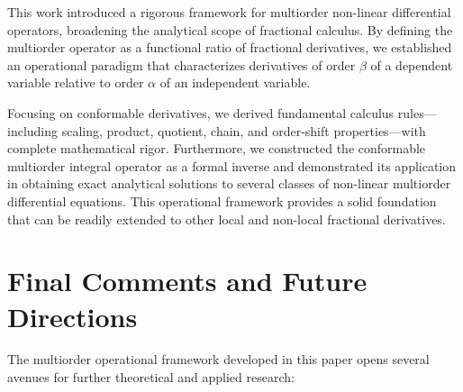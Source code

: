 \documentclass[oneside,10pt]{article}
\theoremstyle{plain}
\theoremstyle{definition}
\begin{document}
This work introduced a rigorous framework for multiorder non-linear differential operators, broadening the analytical scope of fractional calculus. By defining the multiorder operator as a functional ratio of fractional derivatives, we established an operational paradigm that characterizes derivatives of order $\beta$ of a dependent variable relative to order $\alpha$ of an independent variable. 

Focusing on conformable derivatives, we derived fundamental calculus rules—including scaling, product, quotient, chain, and order-shift properties—with complete mathematical rigor. Furthermore, we constructed the conformable multiorder integral operator as a formal inverse and demonstrated its application in obtaining exact analytical solutions to several classes of non-linear multiorder differential equations. This operational framework provides a solid foundation that can be readily extended to other local and non-local fractional derivatives.

\section{Final Comments and Future Directions}\label{sec:final_comments}

The multiorder operational framework developed in this paper opens several avenues for further theoretical and applied research:
\end{document}
